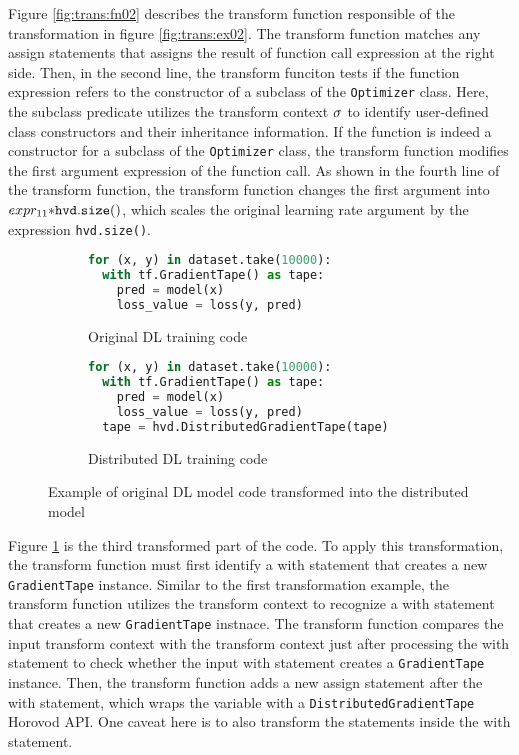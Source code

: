 Figure \ref{fig:trans:fn02} describes the transform function responsible of
the transformation in figure \ref{fig:trans:ex02}.
The transform function matches any assign statements that assigns the
result of function call expression at the right side.
Then, in the second line, the transform funciton tests if the function
expression  refers to the constructor of a subclass of the
{\tt Optimizer} class.
Here, the subclass predicate \ktsubtysubs{\smodenv} utilizes the transform 
context $\sigma$ to identify user-defined class constructors and their 
inheritance information.
If the function  is indeed a constructor for a subclass of the
{\tt Optimizer} class, the transform function modifies the 
first argument expression of the function call.
As shown in the fourth line of the transform function, the  
transform function changes the first argument 
into $expr_{11} {\tt * hvd.size()}$, which scales the original
learning rate argument by the expression {\tt hvd.size()}.

\begin{figure}[ht!]
  \centering
  \begin{subfigure}[t]{0.48\textwidth}
    \begin{lstlisting}[language=Python]
for (x, y) in dataset.take(10000):
  with tf.GradientTape() as tape:
    pred = model(x)
    loss_value = loss(y, pred)\end{lstlisting} 
    \caption{Original DL training code}
  \end{subfigure}
  \hspace{5mm}
  \begin{subfigure}[t]{0.48\textwidth}
    \begin{lstlisting}[language=Python]
for (x, y) in dataset.take(10000):
  with tf.GradientTape() as tape:
    pred = model(x)
    loss_value = loss(y, pred) 
  tape = hvd.DistributedGradientTape(tape)\end{lstlisting}
    \caption{Distributed DL training code}
  \end{subfigure}
  \caption{Example of original DL model code transformed into the distributed model}
  \label{fig:trans:ex03}
\end{figure}

Figure \ref{fig:trans:ex03} is the third transformed part of the code.
To apply this transformation, the transform function must first identify
a with statement that creates a new {\tt GradientTape} instance. 
Similar to the first transformation example, 
the transform function utilizes the transform context to recognize a
with statement that creates a new {\tt GradientTape} instnace. 
The transform function compares the input transform context with the 
transform context just after processing the with statement to check
whether the input with statement creates a {\tt GradientTape} instance.
Then, the transform function adds a new assign statement after the 
with statement, which wraps the variable with a
{\tt DistributedGradientTape} Horovod API.
One caveat here is to also transform the statements inside the with
statement.  
 
